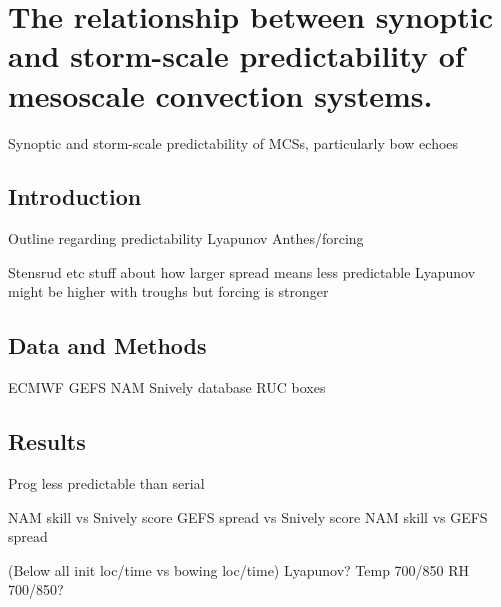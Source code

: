\chapter{The relationship between synoptic and storm-scale predictability of mesoscale convection systems.}

Synoptic and storm-scale predictability of MCSs, particularly bow echoes

\section{Introduction}

Outline regarding predictability
Lyapunov
Anthes/forcing

Stensrud etc stuff about how larger spread means less predictable
Lyapunov might be higher with troughs but forcing is stronger

\section{Data and Methods}

ECMWF
GEFS
NAM
Snively database
RUC boxes

\section{Results}

Prog less predictable than serial

NAM skill vs Snively score
GEFS spread vs Snively score
NAM skill vs GEFS spread

(Below all init loc/time vs bowing loc/time)
Lyapunov?
Temp 700/850
RH 700/850?






